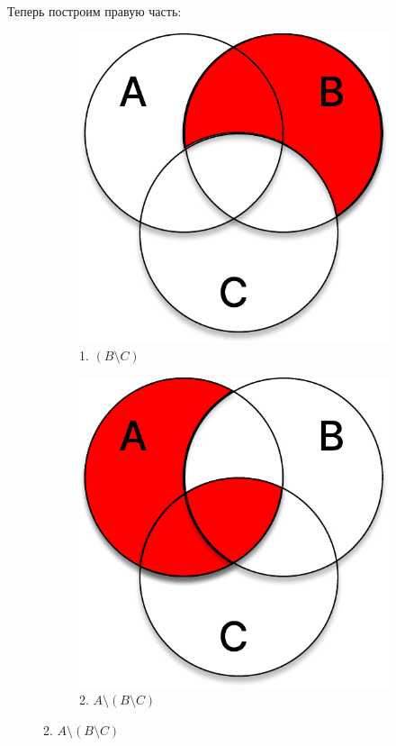 \documentclass[11pt]{article}
\begin{document}
Теперь построим правую часть:

\begin{figure}[h]
        \captionsetup[subfigure]{labelformat=empty}
        \centering
        \begin{subfigure}{.32\textwidth}
                \centering
                \includegraphics[width=1\linewidth]{t3_2_1.pdf}
                \caption{1. $(B \setminus C)$}
        \end{subfigure}
        \begin{subfigure}{.32\textwidth}
                \centering
                \includegraphics[width=1\linewidth]{t3_2_2.pdf}
                \caption{2. $A \setminus (B \setminus C)$}
        \end{subfigure}
\end{figure}
\end{document}
